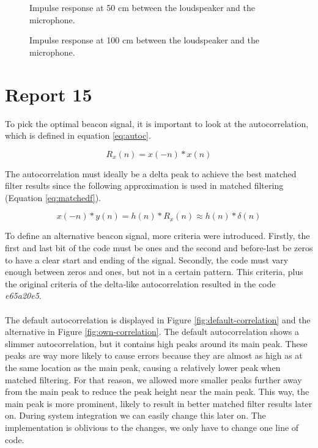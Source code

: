\documentclass[final]{scrreprt} %
\begin{document}
\begin{figure}[H]
	\centering
	\setlength\figureheight{4cm}
    	\setlength{}
	
	\caption{Impulse response at 50 cm between the loudspeaker and the microphone.}
	\label{fig:50cm}
\end{figure}

\begin{figure}[H]
	\centering
	\setlength\figureheight{4cm}
    	\setlength{}
	
	\caption{Impulse response at 100 cm between the loudspeaker and the microphone.}
	\label{fig:100cm}
\end{figure}
\section{Report 15}
To pick the optimal beacon signal, it is important to look at the autocorrelation, which is defined in equation \ref{eq:autoc}.

\begin{equation}
	R_x(n) = x(-n) * x(n)
	\label{eq:autoc}
\end{equation}

The autocorrelation must ideally be a delta peak to achieve the best matched filter results since the following approximation is used in matched filtering (Equation \ref{eq:matchedf}).

\begin{equation}
	x(-n) * y(n) = h(n) * R_x(n) \approx h(n) * \delta (n)
	\label{eq:matchedf}
\end{equation}

To define an alternative beacon signal, more criteria were introduced.
Firstly, the first and last bit of the code must be ones and the second and before-last be zeros to have a clear start and ending of the signal.
Secondly, the code must vary enough between zeros and ones, but not in a certain pattern.
This criteria, plus the original criteria of the delta-like autocorrelation resulted in the code \emph{e65a20e5}.
\\ \\
The default autocorrelation is displayed in Figure \ref{fig:default-correlation} and the alternative in Figure \ref{fig:own-correlation}.
The default autocorrelation shows a slimmer autocorrelation, but it contains high peaks around its main peak.
These peaks are way more likely to cause errors because they are almost as high as at the same location as the main peak, causing a relatively lower peak when matched filtering.
For that reason, we allowed more smaller peaks further away from the main peak to reduce the peak height near the main peak.
This way, the main peak is more prominent, likely to result in better matched filter results later on.
During system integration we can easily change this later on.
The implementation is oblivious to the changes, we only have to change one line of code.
\end{document}
